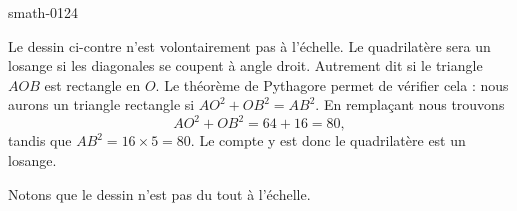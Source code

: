 
\begin{corrige}{smath-0124}

    \begin{multicols}{2}
        Le dessin ci-contre n'est volontairement pas à l'échelle. Le quadrilatère sera un losange si les diagonales se coupent à angle droit. Autrement dit si le triangle \( AOB\) est rectangle en \( O\). Le théorème de Pythagore permet de vérifier cela : nous aurons un triangle rectangle si \( AO^2+OB^2=AB^2\). En remplaçant nous trouvons
        \begin{equation}
            AO^2+OB^2=64+16=80,
        \end{equation}
        tandis que \( AB^2=16\times 5=80\). Le compte y est donc le quadrilatère est un losange.

        Notons que le dessin n'est pas du tout à l'échelle.


        \columnbreak


        \begin{center}
        
        \end{center}

    \end{multicols}
    

\end{corrige}
